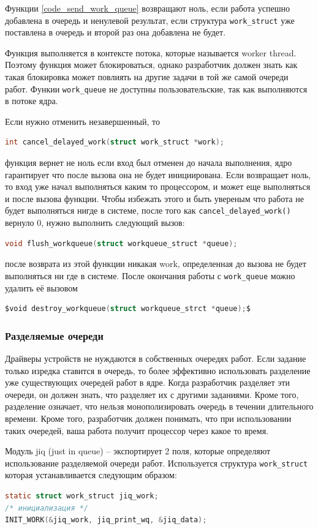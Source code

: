 Функции \ref{code_send_work_queue} возвращают ноль, если работа успешно добавлена в очередь и ненулевой результат, если структура \verb|work_struct| уже поставлена в очередь и второй раз она добавлена не будет.

Функция выполняется в контексте потока, которые называется worker thread. Поэтому функция может блокироваться, однако разработчик должен знать как такая блокировка может повлиять на другие задачи в той же самой очереди работ. Функии \verb|work_queue| не доступны пользовательские, так как выполняются в потоке ядра. 

Если нужно отменить незавершенный, то 
\begin{lstlisting}[language=c]
int cancel_delayed_work(struct work_struct *work);
\end{lstlisting}
функция вернет не ноль если вход был отменен до начала выполнения, ядро гарантирует что после вызова она не будет инициирована. Если возвращает ноль, то вход уже начал выполняться каким то процессором, и может еще выполняться и после вызова функции. Чтобы избежать этого и быть увереным что работа не будет выполняться нигде в системе, после того как \verb|cancel_delayed_work()| вернуло 0, нужно выполнить следующий вызов:
\begin{lstlisting}[language=c]
void flush_workqueue(struct workqueue_struct *queue);
\end{lstlisting}
после возврата из этой функции никакая work, определенная до вызова не будет выполняться ни где в системе. После окончания работы с \verb|work_queue| можно удалить её вызовом
\begin{lstlisting}[language=c]
$void destroy_workqueue(struct workqueue_strct *queue);$
\end{lstlisting}

\subsubsection{Разделяемые очереди}
Драйверы устройств не нуждаются в собственных очередях работ. Если задание только изредка ставится в очередь, то более эффективно использовать разделение уже существующих очередей работ в ядре. Когда разработчик разделяет эти очереди, он должен знать, что разделяет их с другими заданиями. Кроме того, разделение означает, что нельзя монополизировать очередь в течении длительного времени. Кроме того, разработчик должен понимать, что при использовании таких очередей, ваша работа получит процессор через какое то время.

Модуль jiq (just in queue) – экспортирует  2 поля, которые определяют использование разделяемой очереди работ. Используется структура \verb|work_struct| которая устанавливается следующим образом:
\begin{lstlisting}[language=c]
static struct work_struct jiq_work;
/* инициализация */
INIT_WORK(&jiq_work, jiq_print_wq, &jiq_data);
\end{lstlisting}

